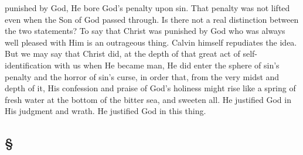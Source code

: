 \documentclass[draft]{ptfdoc}
\begin{document}
punished by God, He bore God's penalty upon 
sin. That penalty was not lifted even when the 
Son of God passed through. Is there not a real 
distinction between the two statements? To 
say that Christ was punished by God who was 
always well pleased with Him is an outrageous 
thing. Calvin himself repudiates the idea. But 
we may say that Christ did, at the depth of that 
great act of self-identification with us when He 
became man, He did enter the sphere of sin's 
penalty and the horror of sin's curse, in order 
that, from the very midst and depth of it, His 
confession and praise of God's holiness might 
rise like a spring of fresh water at the bottom 
of the bitter sea, and sweeten all. He justified 
God in His judgment and wrath. He justified 
God in this thing. 

\subsection*{
\S
}
\end{document}
